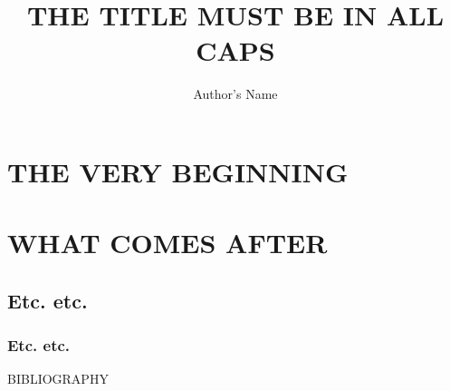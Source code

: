 \documentclass[12pt,lof,lot,los]{olemissthesis}
\title{THE TITLE MUST BE IN ALL CAPS}
\author{Author's Name} %
\begin{document}
\makefrontmatter
\normalem %

\part{THE VERY BEGINNING}



\part{WHAT COMES AFTER}
\chapter{Etc. etc.}
\section{Etc. etc.}

\listofappendices %
\appendix %


\singlespacing

\cleardoublepage
\ifdefined{}
\else
\fi
{}

\newpage
{}
\vspace*{\fill}
\begin{center}\normalfont\normalsize{BIBLIOGRAPHY}\end{center}
\vspace*{\fill}

\newpage
\begingroup
  \def\chapter*#1{}
{}

\endgroup
\end{document}
